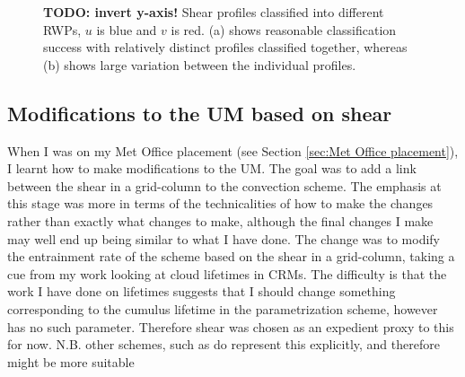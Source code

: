 \documentclass[11pt,a4paper]{article}
\newcommand\todo[1]{\textbf{TODO: #1}}
\begin{document}
\begin{figure}[htp!]%
    \centering
    \qquad
    \caption{\todo{invert y-axis!} Shear profiles classified into different RWPs, $u$ is blue and $v$ is red. (a) shows reasonable classification success with relatively distinct profiles classified together, whereas (b) shows large variation between the individual profiles.}%
    \label{fig:shear_profiles}%
\end{figure}


\subsection{Modifications to the UM based on shear}
\label{sec:um_mod}

When I was on my Met Office placement (see Section \ref{sec:Met Office placement}), I learnt how to make modifications to the UM. The goal was to add a link between the shear in a grid-column to the convection scheme. The emphasis at this stage was more in terms of the technicalities of how to make the changes rather than exactly what changes to make, although the final changes I make may well end up being similar to what I have done. The change was to modify the entrainment rate of the scheme based on the shear in a grid-column, taking a cue from my work looking at cloud lifetimes in CRMs. The difficulty is that the work I have done on lifetimes suggests that I should change something corresponding to the cumulus lifetime in the parametrization scheme, however \cite{gregory1990mass} has no such parameter. Therefore shear was chosen as an expedient proxy to this for now. N.B. other schemes, such as \cite{plant2008stochastic} do represent this explicitly, and therefore might be more suitable 
\end{document}
